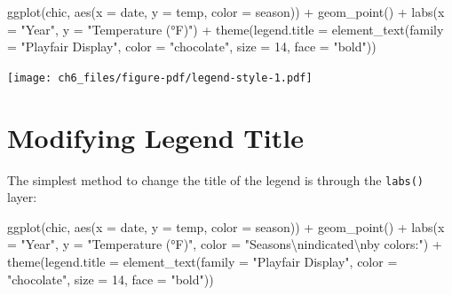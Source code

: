\documentclass[
  letterpaper,
  DIV=11,
  numbers=noendperiod]{scrreprt}
\newenvironment{Shaded}{\begin{snugshade}}{\end{snugshade}}
\newcommand{\AttributeTok}[1]{\textcolor[rgb]{0.40,0.45,0.13}{#1}}
\newcommand{\DecValTok}[1]{\textcolor[rgb]{0.68,0.00,0.00}{#1}}
\newcommand{\FunctionTok}[1]{\textcolor[rgb]{0.28,0.35,0.67}{#1}}
\newcommand{\NormalTok}[1]{\textcolor[rgb]{0.00,0.23,0.31}{#1}}
\newcommand{\SpecialCharTok}[1]{\textcolor[rgb]{0.37,0.37,0.37}{#1}}
\newcommand{\StringTok}[1]{\textcolor[rgb]{0.13,0.47,0.30}{#1}}
\begin{document}
\begin{Shaded}
\begin{Highlighting}[]
\FunctionTok{ggplot}\NormalTok{(chic, }\FunctionTok{aes}\NormalTok{(}\AttributeTok{x =}\NormalTok{ date, }\AttributeTok{y =}\NormalTok{ temp, }\AttributeTok{color =}\NormalTok{ season)) }\SpecialCharTok{+}
  \FunctionTok{geom\_point}\NormalTok{() }\SpecialCharTok{+}
  \FunctionTok{labs}\NormalTok{(}\AttributeTok{x =} \StringTok{"Year"}\NormalTok{, }\AttributeTok{y =} \StringTok{"Temperature (°F)"}\NormalTok{) }\SpecialCharTok{+}
  \FunctionTok{theme}\NormalTok{(}\AttributeTok{legend.title =} \FunctionTok{element\_text}\NormalTok{(}\AttributeTok{family =} \StringTok{"Playfair Display"}\NormalTok{,}
                                    \AttributeTok{color =} \StringTok{"chocolate"}\NormalTok{,}
                                    \AttributeTok{size =} \DecValTok{14}\NormalTok{, }\AttributeTok{face =} \StringTok{"bold"}\NormalTok{))}
\end{Highlighting}
\end{Shaded}

\texttt{[image: ch6\_files/figure-pdf/legend-style-1.pdf]}

\section{Modifying Legend Title}\label{modifying-legend-title}

The simplest method to change the title of the legend is through the
\texttt{labs()} layer:

\begin{Shaded}
\begin{Highlighting}[]
\FunctionTok{ggplot}\NormalTok{(chic, }\FunctionTok{aes}\NormalTok{(}\AttributeTok{x =}\NormalTok{ date, }\AttributeTok{y =}\NormalTok{ temp, }\AttributeTok{color =}\NormalTok{ season)) }\SpecialCharTok{+}
  \FunctionTok{geom\_point}\NormalTok{() }\SpecialCharTok{+}
  \FunctionTok{labs}\NormalTok{(}\AttributeTok{x =} \StringTok{"Year"}\NormalTok{, }\AttributeTok{y =} \StringTok{"Temperature (°F)"}\NormalTok{,}
       \AttributeTok{color =} \StringTok{"Seasons}\SpecialCharTok{\textbackslash{}n}\StringTok{indicated}\SpecialCharTok{\textbackslash{}n}\StringTok{by colors:"}\NormalTok{) }\SpecialCharTok{+}
  \FunctionTok{theme}\NormalTok{(}\AttributeTok{legend.title =} \FunctionTok{element\_text}\NormalTok{(}\AttributeTok{family =} \StringTok{"Playfair Display"}\NormalTok{,}
                                    \AttributeTok{color =} \StringTok{"chocolate"}\NormalTok{,}
                                    \AttributeTok{size =} \DecValTok{14}\NormalTok{, }\AttributeTok{face =} \StringTok{"bold"}\NormalTok{))}
\end{Highlighting}
\end{Shaded}
\end{document}

